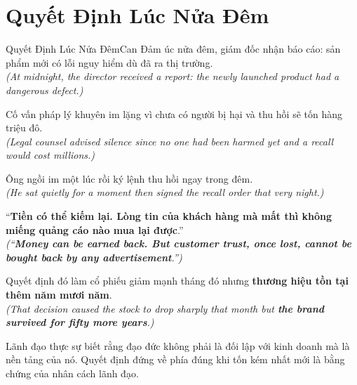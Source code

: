 \section{Quyết Định Lúc Nửa Đêm}
\begin{truyen}{Quyết Định Lúc Nửa Đêm}{Can Đảm}
úc nửa đêm, giám đốc nhận báo cáo: sản phẩm mới có lỗi nguy hiểm dù đã ra thị trường.\\
\textit{(At midnight, the director received a report: the newly launched product had a dangerous defect.)}

Cố vấn pháp lý khuyên im lặng vì chưa có người bị hại và thu hồi sẽ tốn hàng triệu đô.\\
\textit{(Legal counsel advised silence since no one had been harmed yet and a recall would cost millions.)}

Ông ngồi im một lúc rồi ký lệnh thu hồi ngay trong đêm.\\
\textit{(He sat quietly for a moment then signed the recall order that very night.)}

``\textbf{Tiền có thể kiếm lại. Lòng tin của khách hàng mà mất thì không miếng quảng cáo nào mua lại được}.''\\
\textit{(``\textbf{Money can be earned back. But customer trust, once lost, cannot be bought back by any advertisement}.'')}

Quyết định đó làm cổ phiếu giảm mạnh tháng đó nhưng \textbf{thương hiệu tồn tại thêm năm mươi năm}.\\
\textit{(That decision caused the stock to drop sharply that month but \textbf{the brand survived for fifty more years}.)}
\end{truyen}
\begin{baihoc}
  Lãnh đạo thực sự biết rằng đạo đức không phải là đối lập với kinh doanh mà là nền tảng của nó. Quyết định đứng về phía đúng khi tốn kém nhất mới là bằng chứng của nhân cách lãnh đạo.
\end{baihoc}

